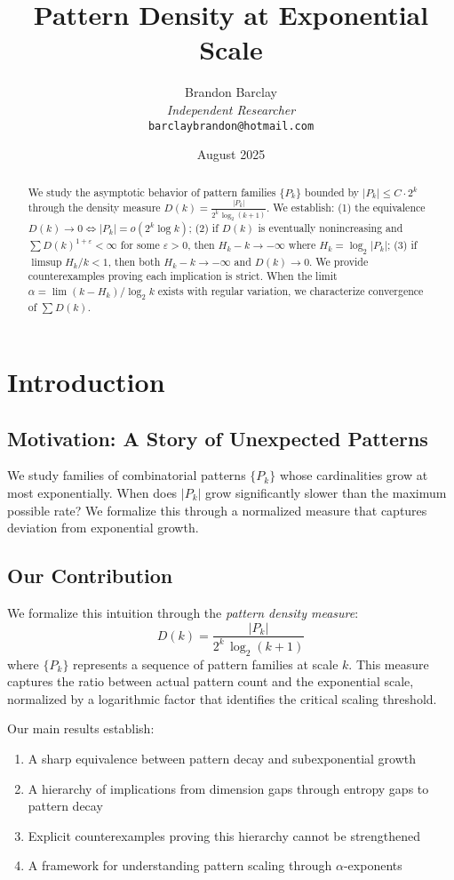 \documentclass[11pt]{article}
\title{Pattern Density at Exponential Scale}
\author{Brandon Barclay\\
\textit{Independent Researcher}\\
\texttt{barclaybrandon@hotmail.com}}
\date{August 2025}
\theoremstyle{definition}
\newcommand{\eps}{\varepsilon}
\begin{document}
\maketitle

\begin{abstract}
We study the asymptotic behavior of pattern families $\{P_k\}$ bounded by $|P_k| \le C \cdot 2^k$ through the density measure $D(k)=\frac{|P_k|}{2^k\,\log_2(k+1)}$. We establish: (1) the equivalence $D(k)\to 0 \iff |P_k|=o(2^k\log k)$; (2) if $D(k)$ is eventually nonincreasing and $\sum D(k)^{1+\eps} < \infty$ for some $\eps > 0$, then $H_k-k\to-\infty$ where $H_k = \log_2|P_k|$; (3) if $\limsup H_k/k<1$, then both $H_k-k\to-\infty$ and $D(k)\to 0$. We provide counterexamples proving each implication is strict. When the limit $\alpha = \lim(k-H_k)/\log_2 k$ exists with regular variation, we characterize convergence of $\sum D(k)$.
\end{abstract}

\section{Introduction}

\subsection{Motivation: A Story of Unexpected Patterns}

We study families of combinatorial patterns $\{P_k\}$ whose cardinalities grow at most exponentially. When does $|P_k|$ grow significantly slower than the maximum possible rate? We formalize this through a normalized measure that captures deviation from exponential growth.

\subsection{Our Contribution}

We formalize this intuition through the \emph{pattern density measure}:
$$D(k) = \frac{|P_k|}{2^k\,\log_2(k+1)}$$
where $\{P_k\}$ represents a sequence of pattern families at scale $k$. This measure captures the ratio between actual pattern count and the exponential scale, normalized by a logarithmic factor that identifies the critical scaling threshold.

Our main results establish:
\begin{enumerate}
\item A sharp equivalence between pattern decay and subexponential growth
\item A hierarchy of implications from dimension gaps through entropy gaps to pattern decay
\item Explicit counterexamples proving this hierarchy cannot be strengthened
\item A framework for understanding pattern scaling through $\alpha$-exponents
\end{enumerate}
\end{document}
